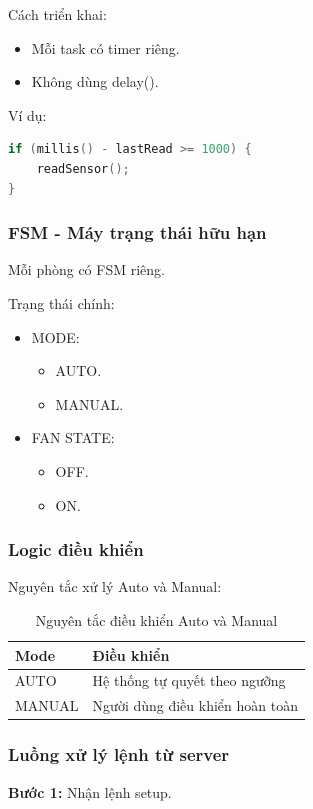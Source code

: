 \documentclass[../BTL_PTIT.tex]{subfiles}
\begin{document}
Cách triển khai:
\begin{itemize}[label=\textbullet]
    \item Mỗi task có timer riêng.
    \item Không dùng delay().
\end{itemize}

Ví dụ:
\begin{lstlisting}[language=C]
if (millis() - lastRead >= 1000) {
    readSensor();
}
\end{lstlisting}

\subsubsection{FSM - Máy trạng thái hữu hạn}
Mỗi phòng có FSM riêng.

Trạng thái chính:
\begin{itemize}[label=\textbullet]
    \item MODE:
    \begin{itemize}[label=--]
        \item AUTO.
        \item MANUAL.
    \end{itemize}
    \item FAN STATE:
    \begin{itemize}[label=--]
        \item OFF.
        \item ON.
    \end{itemize}
\end{itemize}

\subsubsection{Logic điều khiển}
Nguyên tắc xử lý Auto và Manual:

\begin{table}[htbp]
\centering
\caption{Nguyên tắc điều khiển Auto và Manual}
\label{tab:auto_manual_logic_no_rtos}
\begin{tabular}{|l|l|}
\hline
\textbf{Mode} & \textbf{Điều khiển} \\
\hline
AUTO & Hệ thống tự quyết theo ngưỡng \\
MANUAL & Người dùng điều khiển hoàn toàn \\
\hline
\end{tabular}
\end{table}

\subsubsection{Luồng xử lý lệnh từ server}
\textbf{Bước 1:} Nhận lệnh setup.
\end{document}
